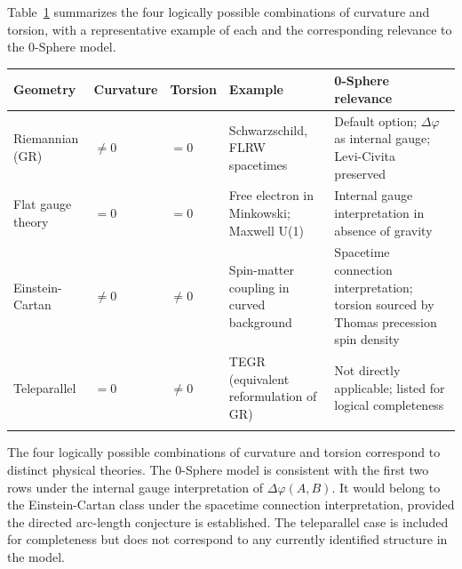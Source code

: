 \documentclass[%
 reprint,
 amsmath,amssymb,
 aps,
 prb,
]{revtex4-2}
\numberwithin{equation}{section}
\begin{document}
Table~\ref{tab:geometry} summarizes the four logically possible combinations of curvature and torsion, with a representative example of each and the corresponding relevance to the 0-Sphere model.

\begin{table}[t!]
\label{tab:geometry}
\renewcommand{\arraystretch}{1.5}
\setlength{\tabcolsep}{7pt}
\begin{tabular}{p{3.5cm}p{2.5cm}p{2.5cm}p{3.5cm}p{3.5cm}}
\toprule
\textbf{Geometry} & \textbf{Curvature} & \textbf{Torsion} & \textbf{Example} & \textbf{0-Sphere relevance} \\
\midrule
Riemannian (GR)
& $\neq 0$ & $= 0$
& Schwarzschild, FLRW spacetimes
& Default option; $\Delta\varphi$ as internal gauge; Levi-Civita preserved \\
\addlinespace[0.3cm]
Flat gauge theory
& $= 0$ & $= 0$
& Free electron in Minkowski; Maxwell U(1)
& Internal gauge interpretation in absence of gravity \\
\addlinespace[0.3cm]
Einstein-Cartan
& $\neq 0$ & $\neq 0$
& Spin-matter coupling in curved background~\cite{hehl1976}
& Spacetime connection interpretation; torsion sourced by Thomas precession spin density \\
\addlinespace[0.3cm]
Teleparallel
& $= 0$ & $\neq 0$
& TEGR (equivalent reformulation of GR)
& Not directly applicable; listed for logical completeness \\
\addlinespace[0.2cm]
\bottomrule
\end{tabular}
\vspace{0.2cm}
\begin{minipage}{0.95\textwidth}
\justifying\footnotesize
The four logically possible combinations of curvature and torsion correspond to distinct physical theories. The 0-Sphere model is consistent with the first two rows under the internal gauge interpretation of $\Delta\varphi(A,B)$. It would belong to the Einstein-Cartan class under the spacetime connection interpretation, provided the directed arc-length conjecture is established. The teleparallel case is included for completeness but does not correspond to any currently identified structure in the model.
\end{minipage}
\end{table}

\end{document}
